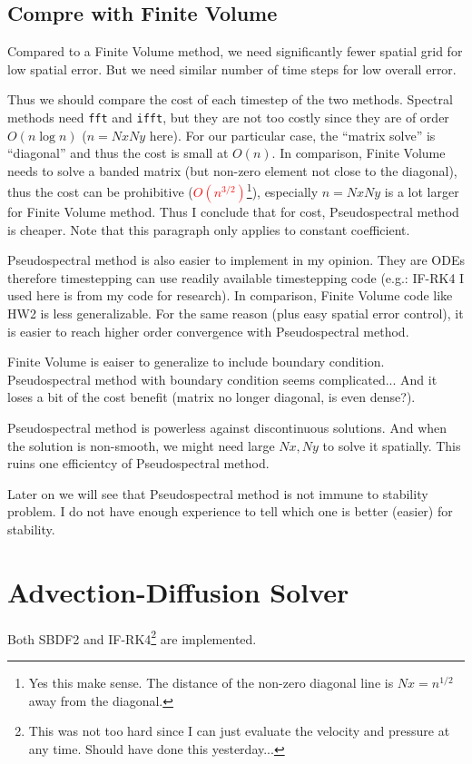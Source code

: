 \documentclass[11pt,letterpaper]{article}
\newcommand{\red}{\textcolor{red}}
\begin{document}
\subsection{Compre with Finite Volume}
Compared to a Finite Volume method, we need significantly fewer spatial grid for low spatial error. But we need similar number of time steps for low overall error. 

Thus we should compare the cost of each timestep of the two methods. Spectral methods need \texttt{fft} and \texttt{ifft}, but they are not too costly since they are of order $O(n\log n)$ ($n = NxNy$ here). For our particular case, the ``matrix solve'' is ``diagonal'' and thus the cost is small at $O(n)$. In comparison, Finite Volume needs to solve a banded matrix (but non-zero element not close to the diagonal), thus the cost can be prohibitive (\red{$O(n^{3/2})$}\footnote{Yes this make sense. The distance of the non-zero diagonal line is $Nx = n^{1/2}$ away from the diagonal.}), especially $n = NxNy$ is a lot larger for Finite Volume method. Thus I conclude that for cost, Pseudospectral method is cheaper. Note that this paragraph only applies to constant coefficient. 

Pseudospectral method is also easier to implement in my opinion. They are ODEs therefore timestepping can use readily available timestepping code (e.g.: IF-RK4 I used here is from my code for research). In comparison, Finite Volume code like HW2 is less generalizable. For the same reason (plus easy spatial error control), it is easier to reach higher order convergence with Pseudospectral method.

Finite Volume is eaiser to generalize to include boundary condition. Pseudospectral method with boundary condition seems complicated... And it loses a bit of the cost benefit (matrix no longer diagonal, is even dense?).

Pseudospectral method is powerless against discontinuous solutions. And when the solution is non-smooth, we might need large $Nx,Ny$ to solve it spatially. This ruins one efficientcy of Pseudospectral method. 

Later on we will see that Pseudospectral method is not immune to stability problem. I do not have enough experience to tell which one is better (easier) for stability. 

\section{Advection-Diffusion Solver}
Both SBDF2 and IF-RK4\footnote{This was not too hard since I can just evaluate the velocity and pressure at any time. Should have done this yesterday...} are implemented.
\end{document}

